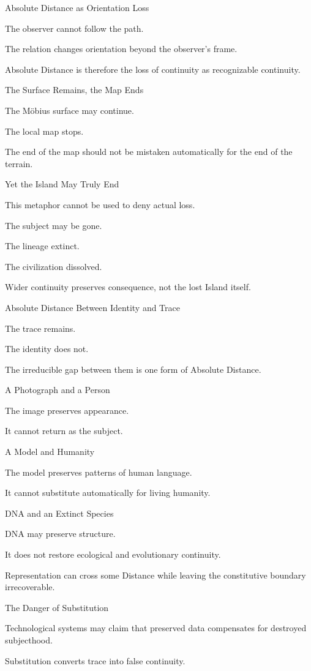 Absolute Distance as Orientation Loss

The observer cannot follow the path.

The relation changes orientation beyond the observer’s frame.

Absolute Distance is therefore the loss of continuity as recognizable continuity.

The Surface Remains, the Map Ends

The Möbius surface may continue.

The local map stops.

The end of the map should not be mistaken automatically for the end of the terrain.

Yet the Island May Truly End

This metaphor cannot be used to deny actual loss.

The subject may be gone.

The lineage extinct.

The civilization dissolved.

Wider continuity preserves consequence, not the lost Island itself.

Absolute Distance Between Identity and Trace

The trace remains.

The identity does not.

The irreducible gap between them is one form of Absolute Distance.

A Photograph and a Person

The image preserves appearance.

It cannot return as the subject.

A Model and Humanity

The model preserves patterns of human language.

It cannot substitute automatically for living humanity.

DNA and an Extinct Species

DNA may preserve structure.

It does not restore ecological and evolutionary continuity.

Representation can cross some Distance while leaving the constitutive boundary irrecoverable.

The Danger of Substitution

Technological systems may claim that preserved data compensates for destroyed subjecthood.

Substitution converts trace into false continuity.

